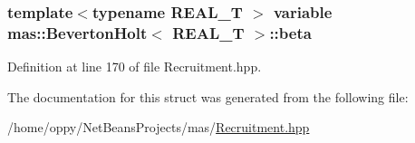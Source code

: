 \hypertarget{structmas_1_1_beverton_holt_a7a6d8c56eb129b679ceb6d8a4e566fc4}{
\subsubsection[{beta}]{\setlength{\rightskip}{0pt plus 5cm}template$<$typename R\-E\-A\-L\-\_\-\-T $>$ {\bf variable} {\bf mas\-::\-Beverton\-Holt}$<$ R\-E\-A\-L\-\_\-\-T $>$\-::beta}}\label{structmas_1_1_beverton_holt_a7a6d8c56eb129b679ceb6d8a4e566fc4}


Definition at line 170 of file Recruitment.\-hpp.



The documentation for this struct was generated from the following file\-:\begin{DoxyCompactItemize}
\item 
/home/oppy/\-Net\-Beans\-Projects/mas/\hyperlink{_recruitment_8hpp}{Recruitment.\-hpp}\end{DoxyCompactItemize}
